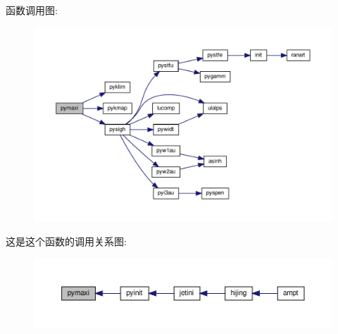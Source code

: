 函数调用图\+:
\nopagebreak
\begin{figure}[H]
\begin{center}
\leavevmode
\includegraphics[width=350pt]{pymaxi_8f90_aa9cb6f1467302508501201a0e38959d1_cgraph}
\end{center}
\end{figure}
这是这个函数的调用关系图\+:
\nopagebreak
\begin{figure}[H]
\begin{center}
\leavevmode
\includegraphics[width=350pt]{pymaxi_8f90_aa9cb6f1467302508501201a0e38959d1_icgraph}
\end{center}
\end{figure}

